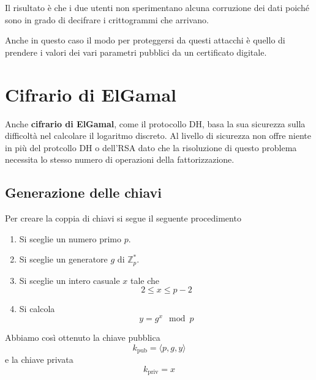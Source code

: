 Il risultato \`e che i due utenti non sperimentano alcuna corruzione dei dati poich\'e sono in grado di decifrare
i crittogrammi che arrivano.

Anche in questo caso il modo per proteggersi da questi attacchi \`e quello di prendere i valori dei vari parametri
pubblici da un certificato digitale.

\section{Cifrario di ElGamal}
Anche \textbf{cifrario di ElGamal}, come il protocollo DH, basa la sua sicurezza sulla difficolt\`a nel calcolare il
logaritmo discreto. Al livello di sicurezza non offre niente in pi\`u del protcollo DH o dell'RSA dato che la
risoluzione di questo problema necessita lo stesso numero di operazioni della fattorizzazione.

\subsection{Generazione delle chiavi}
Per creare la coppia di chiavi si segue il seguente procedimento
\begin{enumerate}
	\item Si sceglie un numero primo $p$.
	\item Si sceglie un generatore $g$ 	di $\mathbb{Z}_p^*$.
	\item Si sceglie un intero casuale $x$ tale che
	      \[ 2 \leq x \leq p-2 \]
	\item Si calcola
	      \[ y = g^x \mod{p} \]
\end{enumerate}
Abbiamo cos\`i ottenuto la chiave pubblica
\[ k_\text{pub} = \langle p, g, y \rangle \]
e la chiave privata
\[ k_\text{priv} = x \]

